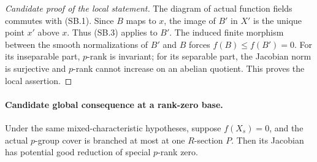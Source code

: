 \begin{proof}[Candidate proof of the local statement]
The diagram of actual function fields commutes with (SB.1).
Since \(B\) maps to \(x\), the image of \(B'\) in
\(X'\) is the unique point \(x'\) above \(x\).
Thus (SB.3) applies to \(B'\). The induced finite morphism
between the smooth normalizations of \(B'\) and \(B\)
forces \(f(B)\le f(B')=0\). For its inseparable part,
\(p\)-rank is invariant; for its separable part, the
Jacobian norm is surjective and \(p\)-rank cannot increase
on an abelian quotient. This proves the local assertion.
\end{proof}

\paragraph{Candidate global consequence at a rank-zero base.}
Under the same mixed-characteristic hypotheses, suppose
\(f(X_s)=0\), and the actual \(p\)-group cover is
branched at most at one \(R\)-section \(P\).
Then its Jacobian has potential good reduction of
special \(p\)-rank zero.

